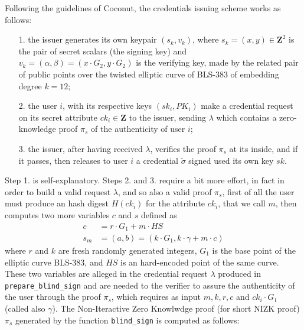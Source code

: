 \documentclass[twocolumn]{article}
\begin{document}
Following the guidelines of Coconut, the credentials issuing scheme works as follows:
\begin{itemize}
\item [1.] the issuer generates its own keypair $(s_k,v_k)$, where $s_k=(x,y)\in\mathbf{Z}^2$ is the pair of secret scalars (the signing key) and $v_k=(\alpha, \beta)=(x\cdot G_2,y\cdot G_2)$ is the verifying key, made by the related pair of public points over the twisted elliptic curve of BLS-383 of embedding degree $k=12$; 
\item [2.] the user $i$, with its respective keys $(sk_i, PK_i)$ make a credential request on its secret attribute $ck_i\in\mathbf{Z}$ to the issuer, sending $\lambda$ which contains a zero-knowledge proof $\pi_s$ of the authenticity of user $i$; 
\item[3.] the issuer, after having received $\lambda$, verifies the proof $\pi_s$ at its inside, and if it passes, then releases to user $i$ a credential $\tilde{\sigma}$ signed used its own key $sk$.
\end{itemize}
Step 1. is self-explanatory. Steps 2. and 3. require a bit more effort, in fact in order to build a valid request $\lambda$, and so also a valid proof $\pi_s$, first of all the user must produce an hash digest $H(ck_i)$ for the attribute $ck_i$, that we call $m$, then computes two more variables $c$ and $s$ defined as
\begin{align*}
c &= r\cdot G_1 + m\cdot HS \\
s_m &= (a,b) = (k \cdot G_1, k\cdot \gamma + m\cdot c)
\end{align*}
where $r$ and $k$ are fresh randomly generated integers, $G_1$ is the base point of the elliptic curve BLS-383, and $HS$ is an hard-encoded point of the same curve. These two variables are alleged in the credential request $\lambda$ produced in \verb!prepare_blind_sign! and are needed to the verifier to assure the authenticity of the user through the proof $\pi_s$, which requires as input $m, k, r, c$ and $ck_i\cdot G_1$ (called also $\gamma$). The Non-Iteractive Zero Knowlwdge proof (for short NIZK proof) $\pi_s$ generated by the function \verb!blind_sign! is computed as follows:
\end{document}
